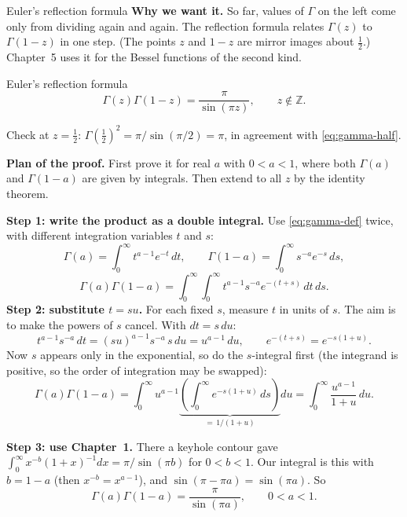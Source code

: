 \documentclass[11pt]{beamer}
\begin{document}
\begin{frame}[allowframebreaks=1.00]{Euler's reflection formula}
\footnotesize
\textbf{Why we want it.} So far, values of \(\Gamma\) on the left come only from dividing again
and again. The reflection formula relates \(\Gamma(z)\) to \(\Gamma(1-z)\) in one step. (The points
\(z\) and \(1-z\) are mirror images about \(\tfrac12\).) Chapter~5 uses it for the Bessel functions
of the second kind.
\begin{block}{Euler's reflection formula}
\vspace{-1.2ex}
\begin{equation}
  \Gamma(z)\Gamma(1-z)=\frac{\pi}{\sin(\pi z)},\qquad z\notin\mathbb Z.
  \label{eq:gamma-reflect}
\end{equation}
\end{block}
Check at \(z=\tfrac12\): \(\Gamma(\tfrac12)^2=\pi/\sin(\pi/2)=\pi\), in agreement with \eqref{eq:gamma-half}.

\textbf{Plan of the proof.} First prove it for real \(a\) with \(0<a<1\), where both
\(\Gamma(a)\) and \(\Gamma(1-a)\) are given by integrals. Then extend to all \(z\) by the
identity theorem.
\par\framebreak\par
\textbf{Step 1: write the product as a double integral.} Use \eqref{eq:gamma-def} twice, with
different integration variables \(t\) and \(s\):
\[
  \Gamma(a)=\int_0^\infty t^{a-1}e^{-t}\,dt,\qquad
  \Gamma(1-a)=\int_0^\infty s^{-a}e^{-s}\,ds,
\]
\[
  \Gamma(a)\Gamma(1-a)
   =\int_0^\infty\!\!\int_0^\infty
      t^{a-1}s^{-a}e^{-(t+s)}\,dt\,ds.
\]
\textbf{Step 2: substitute \(t=su\).} For each fixed \(s\), measure \(t\) in units of \(s\). The aim
is to make the powers of \(s\) cancel. With \(dt=s\,du\):
\[
  t^{a-1}s^{-a}\,dt=(su)^{a-1}s^{-a}\,s\,du=u^{a-1}\,du,
  \qquad
  e^{-(t+s)}=e^{-s(1+u)}.
\]
Now \(s\) appears only in the exponential, so do the \(s\)-integral first (the integrand is
positive, so the order of integration may be swapped):
\[
  \Gamma(a)\Gamma(1-a)
   =\int_0^\infty u^{a-1}
      \underbrace{\left(\int_0^\infty e^{-s(1+u)}\,ds\right)}_{=\,1/(1+u)}du
   =\int_0^\infty\frac{u^{a-1}}{1+u}\,du.
\]
\par\framebreak\par
\textbf{Step 3: use Chapter~1.} There a keyhole contour gave
\(\int_0^\infty x^{-b}(1+x)^{-1}dx=\pi/\sin(\pi b)\) for \(0<b<1\). Our integral is this with
\(b=1-a\) (then \(x^{-b}=x^{a-1}\)), and \(\sin(\pi-\pi a)=\sin(\pi a)\). So
\[
  \Gamma(a)\Gamma(1-a)=\frac{\pi}{\sin(\pi a)},\qquad 0<a<1.
\]


\end{frame}
\end{document}
